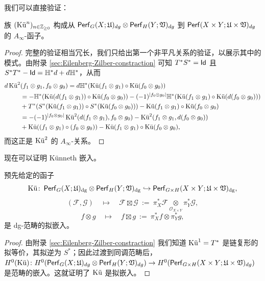 我们可以直接验证：
\begin{prp}
族 $(\Ku^n)_{n\in\mathbb{Z}_{\geq0}}$ 构成从 $\Perf_G (X;\mathfrak{U})_{dg}\otimes\Perf_H (Y;\mathfrak{V})_{dg}$ 到 $\Perf (X\times Y;\mathfrak{U}\times\mathfrak{V})_{dg}$ 的 $A_{\infty}$-函子。
\end{prp}
\begin{proof}
完整的验证相当冗长，我们只给出第一个非平凡关系的验证，以展示其中的模式。由附录 \ref{sec:Eilenberg-Zilber-constraction} 可知 $T^{\ast} S^{\ast} =\id$ 且 $S^{\ast} T^{\ast} -\id =\mathbb{H}^{\ast}d+d\mathbb{H}^{\ast}$，从而
\begin{align*}
d\Ku^2& (f_1\otimes g_1,f_0\otimes g_0)=d\mathbb{H}^{\ast} (\Ku (f_1\otimes g_1)\circ\Ku (f_0\otimes g_0))\\ 
&=-\mathbb{H}^{\ast} (\Ku (d(f_1\otimes g_1))\circ \Ku (f_0\otimes g_0)) -(-1)^{\vert f_0\otimes g_0\vert }\mathbb{H}^{\ast} (\Ku(f_1\otimes g_1)\circ\Ku (d(f_0\otimes g_0)))\\
&+T^{\ast} (S^{\ast}(\Ku (f_1\otimes g_1))\circ S^{\ast} (\Ku (f_0\otimes g_0))) -\Ku (f_1\otimes g_1)\circ\Ku (f_0\otimes g_0)\\ 
&=-(-1)^{\vert f_0\otimes g_0\vert }\Ku^2 (d(f_1\otimes g_1),f_0\otimes g_0) - \Ku^2(f_1\otimes g_1,d(f_0\otimes g_0))\\ 
&+\Ku((f_1\otimes g_1)\circ (f_0\otimes g_0))-\Ku (f_1\otimes g_1)\circ\Ku (f_0\otimes g_0),
\end{align*}
而这正是 $\Ku^2$ 的 $A_{\infty}$-关系。
\end{proof}

现在可以证明 Künneth 嵌入。
\begin{thm}\label{thm:Kunneth-embedding}
预先给定的函子
$$
\Ku\colon\Perf_G(X;\mathfrak{U})_{\dg}
\otimes
\Perf_H(Y;\mathfrak{V})_{\dg}
\hookrightarrow
\Perf_{G\times H}(X\times Y;\mathfrak{U}\times\mathfrak{V})_{\dg},
$$
$$
(\mathcal{F},\mathcal{G})
\quad\mapsto\quad
\mathcal{F}\boxtimes\mathcal{G}
~:=~
\pi_X^*\mathcal{F}
\underset{\mathcal{O}_{X\times Y}}{\otimes}
\pi_Y^*\mathcal{G},
$$
$$
f\otimes g
\quad\mapsto\quad
f\boxtimes g
~:=~
\pi_X^*f
\otimes
\pi_Y^*g,
$$
是 dg-范畴的拟嵌入。
\end{thm}
\begin{proof}
由附录 \ref{sec:Eilenberg-Zilber-constraction} 我们知道 $\Ku^1 =T^{\ast}$ 是链复形的拟等价，其拟逆为 $S^{\ast}$；因此过渡到同调范畴后，$H^0 (\Ku)\colon H^0 (\Perf_G (X;\mathfrak{U})_{dg}\otimes\Perf_H (Y;\mathfrak{V})_{dg})\to H^0 (\Perf_{G\times H} (X\times Y;\mathfrak{U}\times\mathfrak{V})_{dg})$ 是范畴的嵌入。这就证明了 $\Ku$ 是拟嵌入。
\end{proof}

